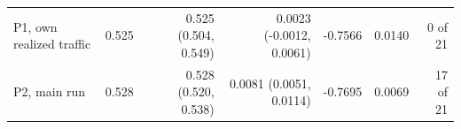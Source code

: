 \begin{tabular}{lrrrrrr}
P1, own realized traffic & 0.525 & 0.525 (0.504, 0.549) & 0.0023 (-0.0012, 0.0061) & -0.7566 & 0.0140 & 0 of 21 \\
P2, main run & 0.528 & 0.528 (0.520, 0.538) & 0.0081 (0.0051, 0.0114) & -0.7695 & 0.0069 & 17 of 21 \\

\end{tabular}
